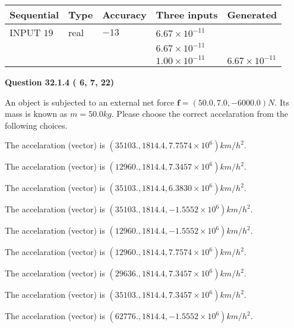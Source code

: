 \documentclass[12pt]{article}
\begin{document}
   
  
  
\noindent\begin{tabular}{|l|l|l|l|l|}
\hline
 Sequential & Type & Accuracy & Three inputs & Generated \\ 
\hline
 
 
  INPUT $          19$ & real & $         -13 $ & $
 6.67 \times 10^{-11}
  $ & \\
  & & &  $
 6.67 \times 10^{-11}
  $ & \\
  & & &  $
 1.00 \times 10^{-11}
 $ & $ 6.67 \times 10^{-11} $ 
 \\  \hline  
 \end{tabular}
   
   
  
\vspace{0.2in}
  
{\textbf{\Large{Question
32.1.4 
 (          6,          7,         22)
}}}
  
  
 
An object is subjected to an external net force $\mathbf{f}=(
50.0 ,
7.0,
-6000.0  )N$. Its mass is known as
$m= %
50.0  kg$. Please choose the correct accelaration
from the following choices.
 
 
 
The accelaration (vector) is
$(
35103.,
1814.4 ,
7.7574 \times 10^{6}
)km/h^2.
$
 
 
The accelaration (vector) is
$(
12960.,
1814.4 ,
7.3457 \times 10^{6}
)km/h^2.
$
 
 
The accelaration (vector) is
$(
35103.,
1814.4 ,
6.3830 \times 10^{6}
)km/h^2.
$
 
 
The accelaration (vector) is
$(
35103.,
1814.4 ,
-1.5552 \times 10^{6}
)km/h^2.
$
 
 
The accelaration (vector) is
$(
12960.,
1814.4 ,
-1.5552 \times 10^{6}
)km/h^2.
$
 
 
The accelaration (vector) is
$(
12960.,
1814.4 ,
7.7574 \times 10^{6}
)km/h^2.
$
 
 
The accelaration (vector) is
$(
29636.,
1814.4 ,
7.3457 \times 10^{6}
)km/h^2.
$
 
 
The accelaration (vector) is
$(
35103.,
1814.4 ,
7.3457 \times 10^{6}
)km/h^2.
$
 
 
The accelaration (vector) is
$(
62776.,
1814.4 ,
-1.5552 \times 10^{6}
)km/h^2.
$
 
\end{document}
